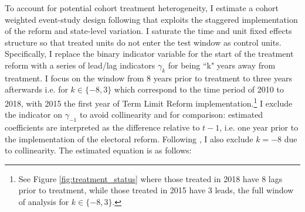 \documentclass[12pt]{amsart}
\numberwithin{equation}{section}
\theoremstyle{definition}
\theoremstyle{definition}
\theoremstyle{definition}
\begin{document}
 To account for potential cohort treatment heterogeneity, I estimate  a cohort weighted event-study design following \citet{abraham_sun_2020} that exploits the staggered implementation of the reform and state-level variation. I saturate the time and unit fixed effects structure so that treated units do not enter the test window as control units. Specifically, I replace the binary indicator variable for the start of the treatment reform with a series of lead/lag indicators $\gamma_k$ for being ``k" years away from treatment. I focus on the window from 8 years prior to treatment to three years afterwards i.e. for $k \in \{-8,3\} $ which correspond to the time period of 2010 to 2018, with 2015 the first year of Term Limit Reform implementation.\footnote{See Figure \ref{fig:treatment_status} where those treated in 2018 have 8 lags prior to treatment, while those treated in 2015 have 3 leads, the full window of analysis for $k \in \{-8,3\} $.} %
I exclude the indicator on $\gamma_{-1}$ to avoid collinearity and for comparison: estimated coefficients are interpreted as the difference relative to $t-1$, i.e. one year prior to the implementation of the electoral reform. Following   \citet{abraham_sun_2020}, I also exclude $k=-8$ due to collinearity. The estimated equation is as follows:
\end{document}
